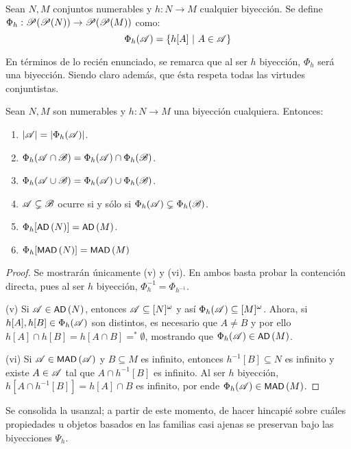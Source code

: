 	\begin{definicion}\label{def-Biyecs-h}
		Sean $N,M$ conjuntos numerables y $h:N \to M$ cualquier biyección. Se define $\Phi_h : \mathscr{P}(\mathscr{P}(N)) \to \mathscr{P}(\mathscr{P}(M))$ como:
		$$ \Phi_h (\mathscr{A}) = \{ h[A] \text{ $|$ } A \in \mathscr{A} \} $$
	\end{definicion}

	En términos de lo recién enunciado, se remarca que al ser $h$ biyección, $\Phi_h$ será una biyección. Siendo claro además, que ésta respeta todas las virtudes conjuntistas.
	
	\begin{proposicion}\label{prop-ADbiyec}
		Sean $N,M$ son numerables y $h:N \to M$ una biyección cualquiera. Entonces:
		\begin{enumerate}
			\item $|\mathscr{A}|=|\Phi_h(\mathscr{A})|$.
			\item $\Phi_h(\mathscr{A} \cap \mathscr{B}) = \Phi_h(\mathscr{A}) \cap \Phi_h(\mathscr{B})$.
			\item $\Phi_h(\mathscr{A} \cup \mathscr{B}) = \Phi_h(\mathscr{A}) \cup \Phi_h(\mathscr{B})$.
			\item $\mathscr{A} \subsetneq \mathscr{B}$ ocurre si y sólo si $\Phi_h(\mathscr{A}) \subsetneq \Phi_h(\mathscr{B})$.
			\item $\Phi_h[\operatorname{\text{\textsf{\small AD}}}\,(N)]=\operatorname{\text{\textsf{\small AD}}}\,(M)$.
			\item $\Phi_h[\operatorname{\text{\textsf{\small MAD}}}\,(N)]=\operatorname{\text{\textsf{\small MAD}}}\,(M)$
		\end{enumerate}
	\end{proposicion}
	\begin{proof}
		Se mostrarán únicamente (v) y (vi). En ambos basta probar la contención directa, pues al ser $h$ biyección, $\Phi_h^{-1} = \Phi_{h^{-1}}$.
		
		(v) Si $\mathscr{A} \in \operatorname{\text{\textsf{\small AD}}}\,(N)$, entonces $\mathscr{A} \subseteq [N]^\omega$ y así $\Phi_h(\mathscr{A}) \subseteq [M]^\omega$. Ahora, si $h[A],h[B] \in \Phi_h(\mathscr{A})$ son distintos, es necesario que $A \neq B$ y por ello $h[A] \cap h[B]=h[A \cap B]=^* \emptyset $, mostrando que $\Phi_h(\mathscr{A}) \in \operatorname{\text{\textsf{\small AD}}}\,(M)$.
	
		(vi) Si $\mathscr{A} \in \operatorname{\text{\textsf{\small MAD}}}\,(\mathscr{A})$ y $B \subseteq M$ es infinito, entonces $h^{-1}[B] \subseteq N$ es infinito y existe $A \in \mathscr{A}$ tal que $A \cap h^{-1}[B]$ es infinito. Al ser $h$ biyección, $h[A \cap h^{-1}[B]]=h[A] \cap B$ es infinito, por ende $\Phi_h(\mathscr{A}) \in \operatorname{\text{\textsf{\small MAD}}}\,(M)$.
	\end{proof}
	
	Se consolida la usanzal; a partir de este momento, de hacer hincapié sobre cuáles propiedades u objetos basados en las familias casi ajenas se preservan bajo las biyecciones $\Psi_h$. 
	
